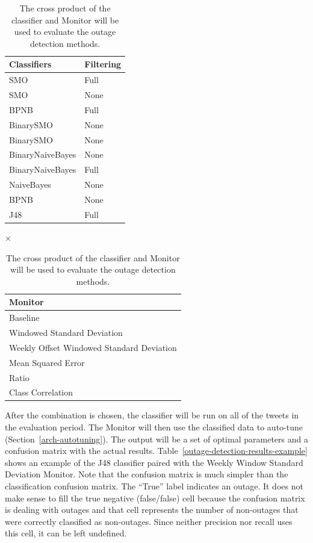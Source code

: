 \documentclass[12pt]{ucthesis}
\begin{document}
\begin{table}[H]
   \footnotesize
   \begin{center}
      \begin{tabular}{|l|l|}
         \hline
            \textbf{Classifiers} & \textbf{Filtering}
         \tabularnewline\hline
            SMO & Full
         \tabularnewline\hline
            SMO & None
         \tabularnewline\hline
            BPNB & Full
         \tabularnewline\hline
            BinarySMO & None
         \tabularnewline\hline
            BinarySMO & None
         \tabularnewline\hline
            BinaryNaiveBayes & None
         \tabularnewline\hline
            BinaryNaiveBayes & Full
         \tabularnewline\hline
            NaiveBayes & None
         \tabularnewline\hline
            BPNB & None
         \tabularnewline\hline
            J48 & Full
         \tabularnewline\hline
      \end{tabular}
      {
         \Huge
         $\times$
      }
      \begin{tabular}{|l|}
         \hline
            \textbf{Monitor}
         \tabularnewline\hline
            Baseline
         \tabularnewline\hline
            Windowed Standard Deviation
         \tabularnewline\hline
            Weekly Offset Windowed Standard Deviation
         \tabularnewline\hline
            Mean Squared Error
         \tabularnewline\hline
            Ratio
         \tabularnewline\hline
            Class Correlation
         \tabularnewline\hline
      \end{tabular}
      \caption[Outage Detection Evaluation Combinations]{The cross product of the classifier and Monitor will be used to evaluate the outage detection methods.}
      \label{table:outageDetectionEvaluationSpace}
   \end{center}
\end{table}

After the combination is chosen, the classifier will be run on all of the tweets in the evaluation period.
The Monitor will then use the classified data to auto-tune (Section~\ref{arch-autotuning}).
The output will be a set of optimal parameters and a confusion matrix with the actual results.
Table~\ref{outage-detection-results-example} shows an example of the J48 classifier paired with the Weekly Window Standard Deviation Monitor.
Note that the confusion matrix is much simpler than the classification confusion matrix.
The ``True'' label indicates an outage.
It does not make sense to fill the true negative (false/false) cell because the confusion matrix is dealing with outages and that cell represents the number of non-outages that were correctly classified as non-outages.
Since neither precision nor recall uses this cell, it can be left undefined.
\end{document}
